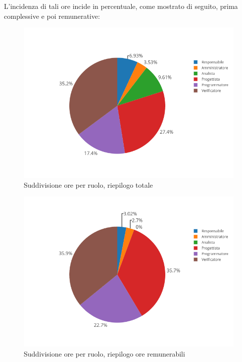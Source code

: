 L'incidenza di tali ore incide in percentuale, come mostrato di seguito, prima complessive e poi remunerative:
\begin{figure}[H]
	\centering
	\includegraphics[scale=0.6]{img/OreTotali.png}
	\caption{Suddivisione ore per ruolo, riepilogo totale}
\end{figure}
\begin{figure}[H]
	\centering
	\includegraphics[scale=0.6]{img/OreRendicontabili.png}
	\caption{Suddivisione ore per ruolo, riepilogo ore remunerabili}
\end{figure}

